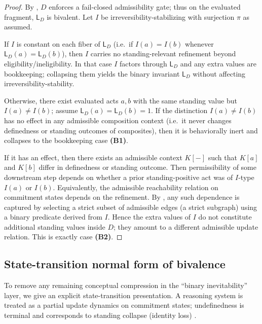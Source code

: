 \documentclass[11pt]{article}
\theoremstyle{definition}
\newcommand{\Stand}{\mathsf{L}}
\begin{document}
\begin{proof}
By , $D$ enforces a fail-closed admissibility gate; thus on the evaluated fragment,
$\Stand_D$ is bivalent.
Let $I$ be irreversibility-stabilizing with surjection $\pi$ as assumed.

If $I$ is constant on each fiber of $\Stand_D$ (i.e.\ if $I(a)=I(b)$ whenever $\Stand_D(a)=\Stand_D(b)$),
then $I$ carries no standing-relevant refinement beyond eligibility/ineligibility.
In that case $I$ factors through $\Stand_D$ and any extra values are bookkeeping; collapsing them yields
the binary invariant $\Stand_D$ without affecting irreversibility-stability.

Otherwise, there exist evaluated acts $a,b$ with the same standing value but $I(a)\neq I(b)$; assume
$\Stand_D(a)=\Stand_D(b)=1$.
If the distinction $I(a)\neq I(b)$ has no effect in any admissible composition context (i.e.\ it never changes definedness
or standing outcomes of composites), then it is behaviorally inert and collapses to the bookkeeping case \textbf{(B1)}.

If it has an effect, then there exists an admissible context $K[-]$ such that $K[a]$ and $K[b]$ differ in definedness or
standing outcome.
Then permissibility of some downstream step depends on whether a prior standing-positive act was of $I$-type $I(a)$ or $I(b)$.
Equivalently, the admissible reachability relation on commitment states depends on the refinement.
By , any such dependence is captured by selecting a strict subset of admissible edges
(a strict subgraph) using a binary predicate derived from $I$.
Hence the extra values of $I$ do not constitute additional standing values inside $D$; they amount to a different admissible
update relation.
This is exactly case \textbf{(B2)}.
\end{proof}

\subsection{State-transition normal form of bivalence}
\label{sec:state-transition-bivalence}

To remove any remaining conceptual compression in the ``binary inevitability'' layer, we give an explicit
state-transition presentation.  A reasoning system is treated as a partial update dynamics on commitment states; 
undefinedness is terminal and corresponds to standing collapse (identity loss) \cite{MaleyStandingCollapseIdentity2026}.
\end{document}
